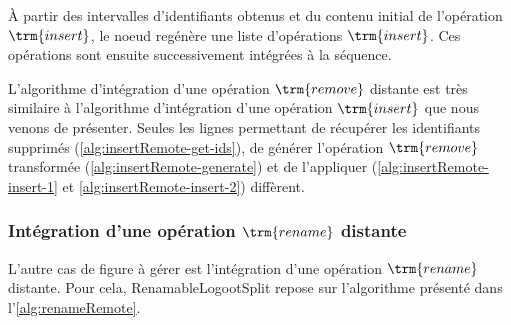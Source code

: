 À partir des intervalles d'identifiants obtenus et du contenu initial de l'opération $\trm{insert}$, le noeud regénère une liste d'opérations $\trm{insert}$.
Ces opérations sont ensuite successivement intégrées à la séquence.

L'algorithme d'intégration d'une opération $\trm{remove}$ distante est très similaire à l'algorithme d'intégration d'une opération $\trm{insert}$ que nous venons de présenter.
Seules les lignes permettant de récupérer les identifiants supprimés (\ref{alg:insertRemote-get-ids}), de générer l'opération $\trm{remove}$ transformée (\ref{alg:insertRemote-generate}) et de l'appliquer (\ref{alg:insertRemote-insert-1} et \ref{alg:insertRemote-insert-2}) diffèrent.

\subsubsection{Intégration d'une opération $\trm{rename}$ distante}

\label{sec:integration-process-rename-op}

L'autre cas de figure à gérer est l'intégration d'une opération $\trm{rename}$ distante.
Pour cela, RenamableLogootSplit repose sur l'algorithme présenté dans l'\autoref{alg:renameRemote}.

